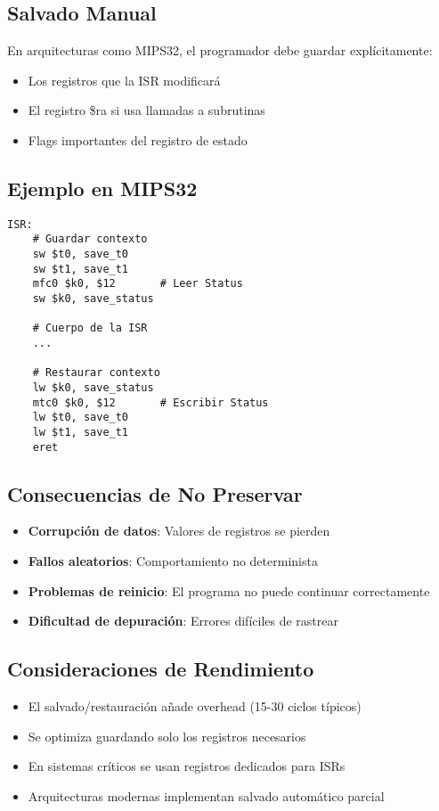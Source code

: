 \documentclass{article}
\begin{document}
\subsection{Salvado Manual}
En arquitecturas como MIPS32, el programador debe guardar explícitamente:
\begin{itemize}
\item Los registros que la ISR modificará
\item El registro \$ra si usa llamadas a subrutinas
\item Flags importantes del registro de estado
\end{itemize}

\subsection{Ejemplo en MIPS32}
\begin{verbatim}
ISR:
    # Guardar contexto
    sw $t0, save_t0
    sw $t1, save_t1
    mfc0 $k0, $12       # Leer Status
    sw $k0, save_status
    
    # Cuerpo de la ISR
    ...
    
    # Restaurar contexto
    lw $k0, save_status
    mtc0 $k0, $12       # Escribir Status
    lw $t0, save_t0
    lw $t1, save_t1
    eret
\end{verbatim}

\subsection{Consecuencias de No Preservar}
\begin{itemize}
\item \textbf{Corrupción de datos}: Valores de registros se pierden
\item \textbf{Fallos aleatorios}: Comportamiento no determinista
\item \textbf{Problemas de reinicio}: El programa no puede continuar correctamente
\item \textbf{Dificultad de depuración}: Errores difíciles de rastrear
\end{itemize}

\subsection{Consideraciones de Rendimiento}
\begin{itemize}
\item El salvado/restauración añade overhead (15-30 ciclos típicos)
\item Se optimiza guardando solo los registros necesarios
\item En sistemas críticos se usan registros dedicados para ISRs
\item Arquitecturas modernas implementan salvado automático parcial
\end{itemize}
\end{document}
